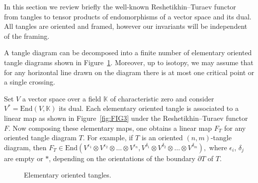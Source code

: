 \documentclass[10pt,a4paper]{amsart}
\numberwithin{equation}{section}
\theoremstyle{definition}
\begin{document}
In this section we review briefly the well-known Reshetikhin--Turaev functor
~\cite{RT,Tu:book} from tangles to tensor products of endomorphisms of a vector
space and its dual. All tangles are oriented and framed, however our invariants
will be independent of the framing.

A tangle diagram can be decomposed into a finite number of elementary
oriented tangle diagrams shown in Figure~\ref{fig:tangles1}. Moreover, up to
 isotopy, we may assume that for any horizontal line drawn on the diagram there is
 at most one critical point or a single crossing.

Set $V$ a vector space over a field $\mathbb{K}$ of characteristic zero and consider
$V^\ast = \mathrm{End}(V,\mathbb{K})$ its dual. Each elementary oriented tangle is associated
to a linear map as shown in Figure~\ref{fig:FIG3} under the Reshetikhin--Turaev functor
$F$. Now composing these elementary maps, one obtains a linear map $F_T$
for any oriented tangle diagram $T$.
For example, if $T$ is an oriented $(n,m)$-tangle diagram, then
$
F_{T} \in \mathrm{End}(V^{\epsilon_1} \otimes V^{\epsilon_2} \otimes \dots
\otimes V^{\epsilon_n}, V^{\delta_1} \otimes V^{\delta_2} \otimes \dots
\otimes V^{\delta_m}) ,
$
where $\epsilon_i$, $\delta_j$ are empty or $\ast$, depending on the
orientations of the boundary $\partial T$ of $T$.

\begin{figure}[htpb!]\centering
{}
\caption{Elementary oriented tangles.}
\label{fig:tangles1}
\end{figure}
\end{document}
